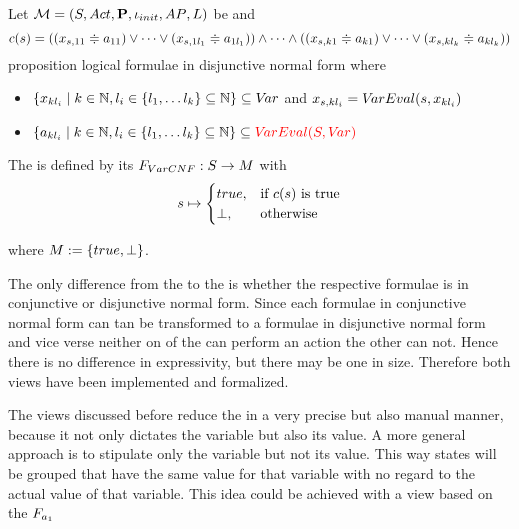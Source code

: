 \documentclass[preview]{standalone}
\begin{document}
\begin{definition}
	Let $\chgph = \chgphtuple$ be \achgphN and 
	\[
	c(s) = ((\varstate[,11] \eqorneq \varval_{11}) \lor \dots \lor (\varstate[,1l_1] \eqorneq \varval_{1l_1})) \land \dots \land ((\varstate[,k1] \eqorneq \varval_{k1}) \lor \dots \lor (\varstate[,kl_k]  \eqorneq \varval_{kl_k}))
	\]
	proposition logical formulae in disjunctive normal form where
	\begin{itemize}
		\item $\{\var_{kl_i} \mid k \in \natnums, l_i \in \{l_1, \dots l_k\} \subseteq \natnums\} \subseteq \vars$ and $\varstate[,kl_i] = \vareval(\state, \var_{kl_i})$
		\item $\{\varval_{kl_i} \mid k \in \natnums, l_i \in \{l_1, \dots l_k\} \subseteq \natnums\} \subseteq \redcomment{\vareval(\states,\vars)}$
	\end{itemize}
	The \viewN \viewparamcnf is defined by its \grpfctN $\gfctparamcnf : \states \to \imggrp$ with
	\[
	\state \mapsto
	\begin{cases}
		true, &\text{if } c(s) \text{ is true}\\
		\remelem, 	&\text{otherwise}
	\end{cases}
	\]
	
	where $\imggrp := \{true, \remelem\}$.
\end{definition}

The only difference from the \viewN \viewparamcnf to the \viewN \viewparamdnf is whether the respective formulae is in conjunctive or disjunctive normal form. Since each formulae in conjunctive normal form can tan be transformed to a formulae in disjunctive normal form and vice verse neither on of the \viewsN can perform an action the other can not. Hence there is no difference in expressivity, but there may be one in size. Therefore both views have been implemented and formalized. 

The views discussed before reduce the \chgphN in a very precise but also manual manner, because it not only dictates the variable but also its value. A more general approach is to stipulate only the variable but not its value. This way states will be grouped that have the same value for that variable with no regard to the actual value of that variable. This idea could be achieved with a view based on the \grpfctN $\grpfct[\varval_1 ]$%
\end{document}
